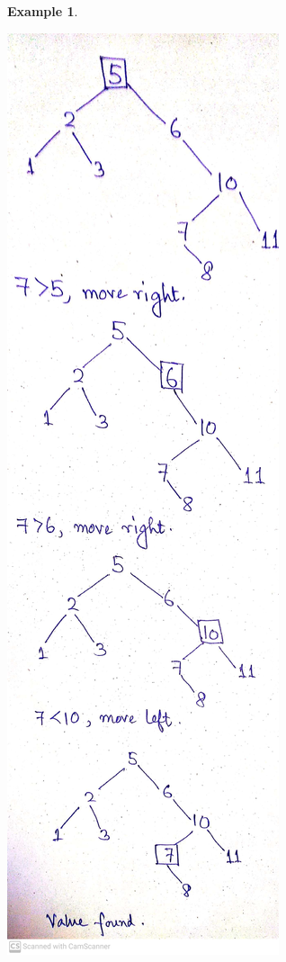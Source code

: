 \documentclass[10pt, a4paper]{extarticle}
\theoremstyle{definition}
\newtheorem{eg}{Example}
\begin{document}
\begin{eg}
\begin{center}
		\includegraphics[scale=0.1]{bst2.jpg}\\
	\end{center}
\end{eg}
\end{document}
